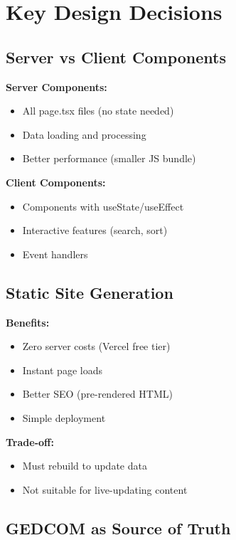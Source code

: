 \documentclass[11pt]{article}
\begin{document}
\section{Key Design Decisions}

\subsection{Server vs Client Components}

\textbf{Server Components:}
\begin{itemize}
    \item All page.tsx files (no state needed)
    \item Data loading and processing
    \item Better performance (smaller JS bundle)
\end{itemize}

\textbf{Client Components:}
\begin{itemize}
    \item Components with useState/useEffect
    \item Interactive features (search, sort)
    \item Event handlers
\end{itemize}

\subsection{Static Site Generation}

\textbf{Benefits:}
\begin{itemize}
    \item Zero server costs (Vercel free tier)
    \item Instant page loads
    \item Better SEO (pre-rendered HTML)
    \item Simple deployment
\end{itemize}

\textbf{Trade-off:}
\begin{itemize}
    \item Must rebuild to update data
    \item Not suitable for live-updating content
\end{itemize}

\subsection{GEDCOM as Source of Truth}
\end{document}
